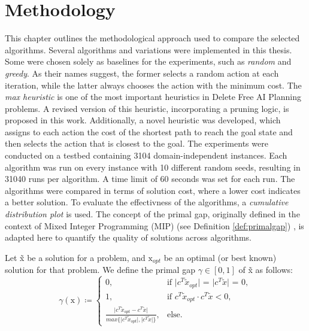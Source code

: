 \chapter{Methodology}
\label{ch:methodology}
This chapter outlines the methodological approach used to compare the selected algorithms.
Several algorithms and variations were implemented in this thesis. Some
were chosen solely as baselines for the experiments, such as \textit{random} and \textit{greedy}.
As their names suggest, the former selects a random action at each iteration, while the latter
always chooses the action with the minimum cost.
The \textit{max heuristic} \cite{bonet2001planning} is one of the most important
heuristics in Delete Free AI Planning problems. A revised version of this heuristic, incorporating
a pruning logic, is proposed in this work.
Additionally, a novel heuristic was developed, which assigns to each action the cost of the shortest path to reach the goal
state and then selects the action that is closest to the goal.
The experiments were conducted on a testbed containing 3104 domain-independent instances.
Each algorithm was run on every instance with 10 different random seeds, resulting in 31040 runs
per algorithm. A time limit of 60 seconds was set for each run.
The algorithms were compared in terms of solution cost, where a lower cost indicates a better solution.
To evaluate the effectivness of the algorithms, a \textit{cumulative distribution plot} is used.
The concept of the primal gap, originally defined in the context of Mixed Integer Programming (MIP)
(see Definition \ref{def:primalgap}) \cite{berthold2013measuring}, is adapted here to quantify the quality of solutions across algorithms.

\begin{definition}
	\label{def:primalgap}
	Let \~x be a solution for a problem, and $\text{\~x}_{opt}$ be an optimal (or best known)
	solution for that problem. We define the primal gap $\gamma \in \left[0, 1\right]$ of \~x as follows:
	\begin{equation*}
		\gamma\left(\text{\~x}\right)\coloneqq\begin{cases}
			0,                                                                                                                            & \text{if $\lvert c^T\tilde{x}_{opt}\rvert$ = $\lvert c^T\tilde{x}\rvert$ = 0}, \\
			1,                                                                                                                            & \text{if $c^T\tilde{x}_{opt} \cdot c^T\tilde{x} < 0$},                         \\
			\frac{\lvert c^T\tilde{x}_{opt} - c^T\tilde{x} \rvert}{max \{\lvert c^T\tilde{x}_{opt} \rvert, \lvert c^T\tilde{x} \rvert\}}, & \text{else}.
		\end{cases}
	\end{equation*}
\end{definition}


